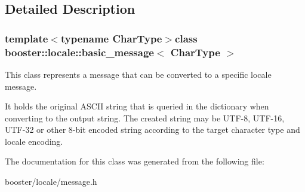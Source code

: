 \subsection{\-Detailed \-Description}
\subsubsection*{template$<$typename \-Char\-Type$>$class booster\-::locale\-::basic\-\_\-message$<$ Char\-Type $>$}

\-This class represents a message that can be converted to a specific locale message. 

\-It holds the original \-A\-S\-C\-I\-I string that is queried in the dictionary when converting to the output string. \-The created string may be \-U\-T\-F-\/8, \-U\-T\-F-\/16, \-U\-T\-F-\/32 or other 8-\/bit encoded string according to the target character type and locale encoding. 

\-The documentation for this class was generated from the following file\-:\begin{DoxyCompactItemize}
\item 
booster/locale/message.\-h\end{DoxyCompactItemize}

